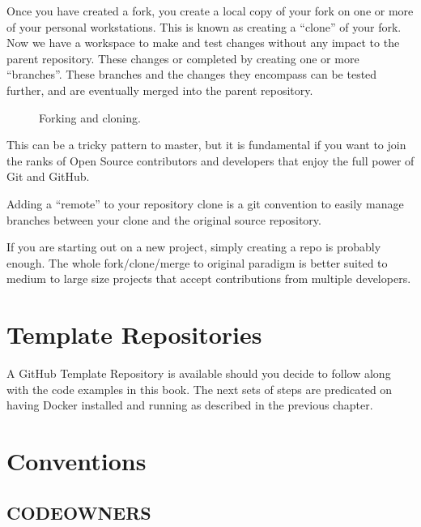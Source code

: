 \justifying
Once you have created a fork, you create a local copy of your fork on one or more of your personal workstations. This is
known as creating a ``clone''  of your fork. Now we have a workspace to make and test changes without
any impact to the parent repository. These changes or completed by creating one or more ``branches''. These branches and the
changes they encompass can be tested further, and are eventually merged into the parent repository.

\begin{figure}[!htb]
\centering

\caption{Forking and cloning.}
\label{forkandclone}
\end{figure}

\justifying
This can be a tricky pattern to master, but it is fundamental if you
want to join the ranks of Open Source contributors and developers that
enjoy the full power of Git and GitHub.

\justifying
Adding a ``remote'' to your repository clone is a git convention to easily manage branches between your clone and
the original source repository.

\justifying
If you are starting out on a new project, simply creating a repo is probably enough. The whole fork/clone/merge to original
paradigm is better suited to medium to large size projects that accept contributions from multiple developers.


\section{Template Repositories}

\justifying
A GitHub Template Repository is available should you decide to follow along with the code examples in this book. The next sets of steps are
predicated on having Docker installed and running as described in the previous chapter.


\section{Conventions}

\subsection{CODEOWNERS}

